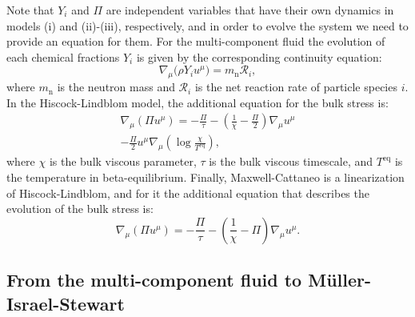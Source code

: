 \documentclass[aps,prd,twocolumn,a4paper,floatfix,nofootbib,superscriptaddress,nofootinbib]{revtex4}
\newcommand{\rn}{\mathrm{n}}
\newcommand{\req}{\mathrm{eq}}
\begin{document}
Note that $Y_i$ and $\Pi$ are independent variables that have their own dynamics in models (i) and (ii)-(iii), respectively, and
in order to evolve the system we need to provide an equation for them.
For the multi-component fluid the evolution of each chemical fractions $Y_i$ is given by the 
corresponding continuity equation:
%
\begin{equation}
\label{eq:chemical}
\nabla_\mu \big( \rho Y_i u^\mu \big)=m_\rn\mathcal R_i,
\end{equation}
%
where $m_\rn$ is the neutron mass and $\mathcal R_i$ is the net reaction rate
of particle species $i$.
%
In the Hiscock-Lindblom model, the additional equation for the bulk stress is:
%
\begin{multline}
\label{eq:hiscock-lindbloom}
\nabla_\mu(\Pi u^\mu)=-\frac\Pi\tau -\left(\frac1\chi-\frac\Pi2\right)\nabla_\mu u^\mu\\
-\frac\Pi2 u^\mu\nabla_\mu\left(\log\frac{\chi}{T^\req}\right),
\end{multline}
%
where $\chi$ is the bulk viscous parameter, $\tau$ is the bulk viscous
timescale, and $T^\req$ is the temperature in
beta-equilibrium.  Finally, Maxwell-Cattaneo is a linearization
of Hiscock-Lindblom, and for it the
additional equation that describes the evolution of the bulk stress is:
%
\begin{equation}
\label{eq:maxwell-cattaneo}
\nabla_\mu(\Pi u^\mu)=-\frac\Pi\tau -\left(\frac1\chi-\Pi\right)\nabla_\mu u^\mu.
\end{equation}
%

\subsection{From the multi-component fluid to M\"uller-Israel-Stewart }
\end{document}
